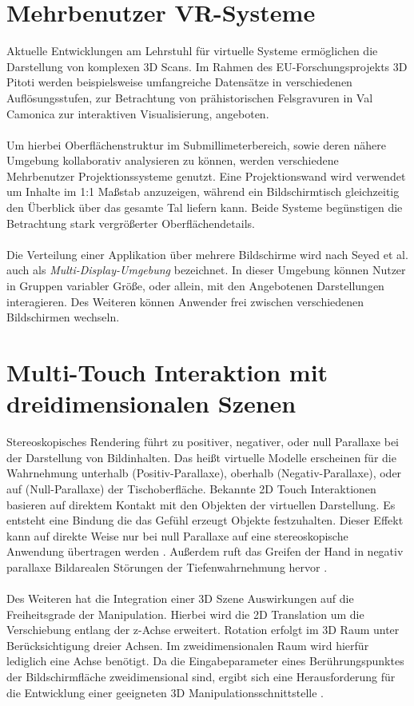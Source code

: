 \section{Mehrbenutzer VR-Systeme}
\label{sec:mehrbenutzer_vr_systeme}

Aktuelle Entwicklungen am Lehrstuhl für virtuelle Systeme ermöglichen die Darstellung von komplexen 3D Scans. Im Rahmen des EU-Forschungsprojekts 3D Pitoti werden beispielsweise umfangreiche Datensätze in verschiedenen Auflösungsstufen, zur Betrachtung von prähistorischen Felsgravuren in Val Camonica zur interaktiven Visualisierung, angeboten. 
\\\\
Um hierbei Oberflächenstruktur im Submillimeterbereich, sowie deren nähere Umgebung kollaborativ analysieren zu können, werden verschiedene Mehrbenutzer Projektionssysteme genutzt. Eine Projektionswand wird verwendet um Inhalte im 1:1 Maßstab anzuzeigen, während ein Bildschirmtisch gleichzeitig den Überblick über das gesamte Tal liefern kann. Beide Systeme begünstigen die Betrachtung stark vergrößerter Oberflächendetails.
\\\\
Die Verteilung einer Applikation über mehrere Bildschirme wird nach Seyed et al. \cite{seyed:2013} auch als \emph{Multi-Display-Umgebung} bezeichnet. In dieser Umgebung können Nutzer in Gruppen variabler Größe, oder allein, mit den Angebotenen Darstellungen interagieren. Des Weiteren können Anwender frei zwischen verschiedenen Bildschirmen wechseln.


\section{Multi-Touch Interaktion mit dreidimensionalen Szenen}
\label{sec:multi_touch_interaktion_mit_3d_szenen}

Stereoskopisches Rendering führt zu positiver, negativer, oder null Parallaxe bei der Darstellung von Bildinhalten. Das heißt virtuelle Modelle erscheinen für die Wahrnehmung unterhalb (Positiv-Parallaxe), oberhalb (Negativ-Parallaxe), oder auf (Null-Parallaxe) der Tischoberfläche. Bekannte 2D Touch Interaktionen basieren auf direktem Kontakt mit den Objekten der virtuellen Darstellung. Es entsteht eine Bindung die das Gefühl erzeugt Objekte festzuhalten. Dieser Effekt kann auf direkte Weise nur bei null Parallaxe auf eine stereoskopische Anwendung übertragen werden \cite{bruder:2013}. Außerdem ruft das Greifen der Hand in negativ parallaxe Bildarealen Störungen der Tiefenwahrnehmung hervor \cite{delariviere:2010}.
\\\\
Des Weiteren hat die Integration einer 3D Szene Auswirkungen auf die Freiheitsgrade der Manipulation. Hierbei wird die 2D Translation um die Verschiebung entlang der z-Achse erweitert. Rotation erfolgt im 3D Raum unter Berücksichtigung dreier Achsen. Im zweidimensionalen Raum wird hierfür lediglich eine Achse benötigt. Da die Eingabeparameter eines Berührungspunktes der Bildschirmfläche zweidimensional sind, ergibt sich eine Herausforderung für die Entwicklung einer geeigneten 3D Manipulationsschnittstelle \cite{martinet:2012}.


